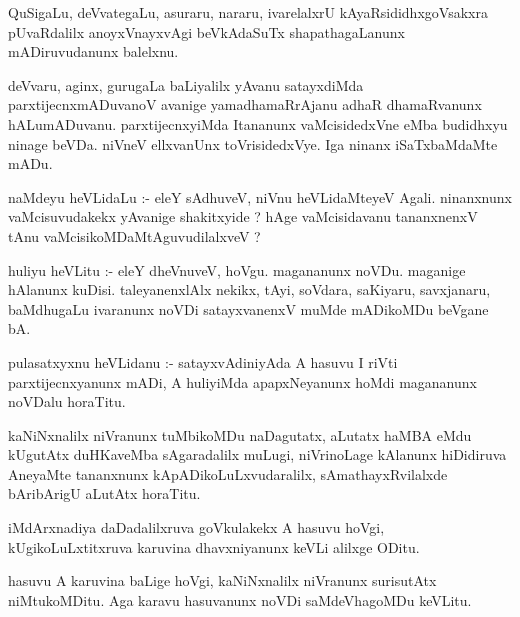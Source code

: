 \documentclass{article}
\begin{document}
\begin{mn}
QuSigaLu,  deVvategaLu,  asuraru,  nararu,  ivarelalxrU  kAyaRsididhxgoVsakxra  
pUvaRdalilx  anoyxVnayxvAgi  beVkAdaSuTx  shapathagaLanunx  mADiruvudanunx  balelxnu.
\end{mn}

\begin{mn}
deVvaru,  aginx,  gurugaLa  baLiyalilx  yAvanu  satayxdiMda  parxtijecnxmADuvanoV  
avanige  yamadhamaRrAjanu  adhaR  dhamaRvanunx  hALumADuvanu.  parxtijecnxyiMda  
Itananunx  vaMcisidedxVne  eMba  budidhxyu  ninage  beVDa.  niVneV  ellxvanUnx  
toVrisidedxVye.  Iga  ninanx  iSaTxbaMdaMte  mADu.
\end{mn}

\begin{mn}
naMdeyu  heVLidaLu :- eleY  sAdhuveV,  niVnu  heVLidaMteyeV  Agali.  ninanxnunx  vaMcisuvudakekx  
yAvanige  shakitxyide ?  hAge  vaMcisidavanu  tananxnenxV  tAnu  vaMcisikoMDaMtAguvudilalxveV ?
\end{mn}

\begin{mn}
huliyu heVLitu :- eleY  dheVnuveV,  hoVgu.  magananunx  noVDu.  maganige  hAlanunx  
kuDisi.  taleyanenxlAlx  nekikx,  tAyi,  soVdara,  saKiyaru,  savxjanaru,  baMdhugaLu  
ivaranunx  noVDi  satayxvanenxV  muMde mADikoMDu  beVgane  bA.
\end{mn}

\begin{mn}
pulasatxyxnu  heVLidanu :- satayxvAdiniyAda  A  hasuvu  I riVti  parxtijecnxyanunx  
mADi,  A  huliyiMda  apapxNeyanunx  hoMdi  magananunx  noVDalu  horaTitu.
\end{mn}

\begin{mn}
kaNiNxnalilx  niVranunx  tuMbikoMDu  naDagutatx,  aLutatx  haMBA  eMdu  kUgutAtx  
duHKaveMba  sAgaradalilx  muLugi,  niVrinoLage  kAlanunx  hiDidiruva  AneyaMte  
tananxnunx  kApADikoLuLxvudaralilx,  sAmathayxRvilalxde  bAribArigU  aLutAtx  horaTitu. 
\end{mn}

\begin{mn}
iMdArxnadiya  daDadalilxruva  goVkulakekx  A  hasuvu  hoVgi,  kUgikoLuLxtitxruva  
karuvina  dhavxniyanunx  keVLi  alilxge  ODitu.
\end{mn}

\begin{mn}
hasuvu  A  karuvina  baLige  hoVgi,  kaNiNxnalilx  niVranunx  surisutAtx  niMtukoMDitu.  
Aga  karavu  hasuvanunx  noVDi  saMdeVhagoMDu keVLitu.
\end{mn}
\end{document}
